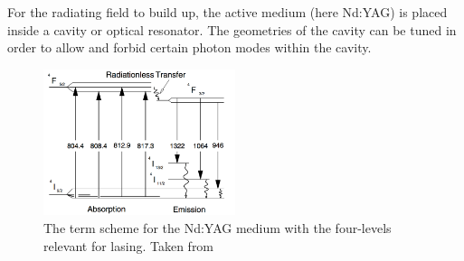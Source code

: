 \documentclass[a4paper]{scrartcl}
\numberwithin{equation}{section}
\numberwithin{figure}{section}
\numberwithin{table}{section}
\begin{document}
For the radiating field to build up, the active medium (here Nd:YAG) is placed inside a cavity or optical resonator. The geometries of the cavity can be tuned in order to allow and forbid certain photon modes within the cavity.


\begin{figure}
\centering
\includegraphics[width=0.5\textwidth]{img/termschema.png}
\caption{\small The term scheme for the Nd:YAG medium with the four-levels relevant for lasing. Taken from \cite{dickmann}}
\label{fig:termschema}
\end{figure}
\end{document}
